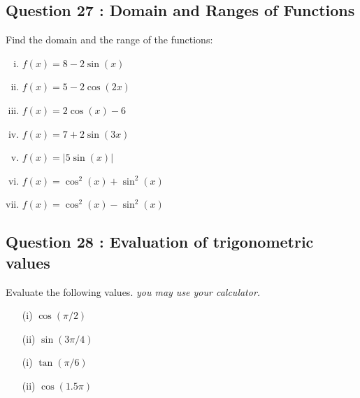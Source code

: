\documentclass[]{article}
\begin{document}
\subsection*{Question 27 : Domain and Ranges of Functions}
Find the domain and the range of the functions:
\begin{multicols}{2}
	\begin{enumerate}[(i)]
		\item $f(x) = 8 - 2 \sin(x)$ 	
		
		\item $f(x) = 5 - 2 \cos(2x)$ 
		\item $f(x) =  2 \cos(x)- 6$ 
		
		\item $f(x) = 7 + 2 \sin(3x)$ 
		
		\item $f(x) = |5\sin(x)|$ 
		
		\item $f(x) = \cos^2(x) +  \sin^2(x)$ 
		\item $f(x) = \cos^2(x) -  \sin^2(x)$ 
	\end{enumerate}	
\end{multicols}		
\smallskip
\subsection*{Question 28 : Evaluation of trigonometric values}
Evaluate the following values. \textit{you may use your calculator.}
\begin{multicols}{2}
	\begin{itemize}
		\item[(i)] $\cos (\pi/2)$
		\item[(ii)] $\sin (3\pi/4)$
		
		\item[(i)] $\tan (\pi/6)$
		\item[(ii)] $\cos (1.5 \pi)$
	\end{itemize} 
\end{multicols}
\bigskip	


\newpage
\end{document}
